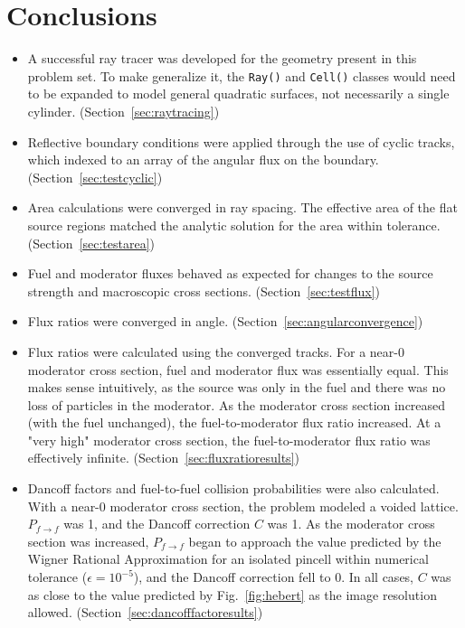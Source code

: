 \documentclass[12pt]{article}
\begin{document}
\section{Conclusions}\label{sec:conclusions}

\begin{itemize}
\item A successful ray tracer was developed for the geometry present in this problem set. 
To make generalize it, the \texttt{Ray()} and \texttt{Cell()} classes would need to be expanded to model general quadratic surfaces, not necessarily a single cylinder. (Section~\ref{sec:raytracing})

\item Reflective boundary conditions were applied through the use of cyclic tracks, which indexed to an array of the angular flux on the boundary. (Section~\ref{sec:testcyclic})

\item Area calculations were converged in ray spacing. The effective area of the flat source regions matched the analytic solution for the area within tolerance. (Section~\ref{sec:testarea})

\item Fuel and moderator fluxes behaved as expected for changes to the source strength and macroscopic cross sections. (Section~\ref{sec:testflux})

\item Flux ratios were converged in angle. (Section~\ref{sec:angularconvergence})

\item Flux ratios were calculated using the converged tracks. For a near-0 moderator cross section, fuel and moderator flux was essentially equal. This makes sense intuitively, as the source was only in the fuel and there was no loss of particles in the moderator. As the moderator cross section increased (with the fuel unchanged), the fuel-to-moderator flux ratio increased. At a "very high" moderator cross section, the fuel-to-moderator flux ratio was effectively infinite. (Section~\ref{sec:fluxratioresults})

\item Dancoff factors and fuel-to-fuel collision probabilities were also calculated. With a near-0 moderator cross section, the problem modeled a voided lattice. $P_{f \rightarrow f}$ was 1, and the Dancoff correction $C$ was 1. As the moderator cross section was increased, $P_{f \rightarrow f}$ began to approach the value predicted by the Wigner Rational Approximation for an isolated pincell within numerical tolerance ($\epsilon = 10^{-5}$), and the Dancoff correction fell to 0. In all cases, $C$ was as close to the value predicted by Fig.~\ref{fig:hebert} as the image resolution allowed. (Section~\ref{sec:dancofffactoresults})

\end{itemize}
\end{document}
